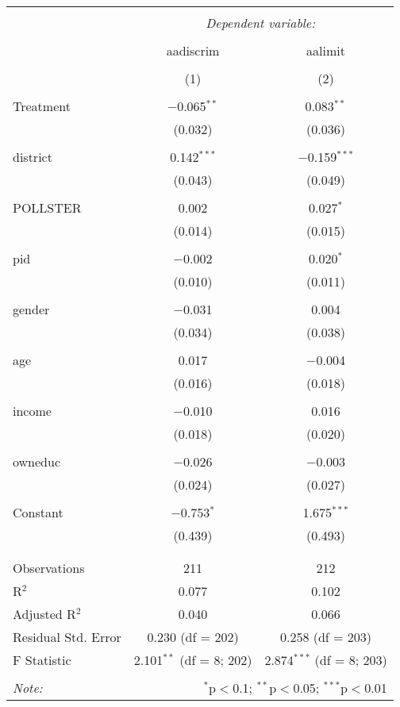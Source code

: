 
\begin{table}[!htbp] \centering 
  \caption{} 
  \label{} 
\begin{tabular}{@{\extracolsep{5pt}}lcc} 
\\[-1.8ex]\hline 
\hline \\[-1.8ex] 
 & \multicolumn{2}{c}{\textit{Dependent variable:}} \\ 
\cline{2-3} 
\\[-1.8ex] & aadiscrim & aalimit \\ 
\\[-1.8ex] & (1) & (2)\\ 
\hline \\[-1.8ex] 
 Treatment & $-$0.065$^{**}$ & 0.083$^{**}$ \\ 
  & (0.032) & (0.036) \\ 
  & & \\ 
 district & 0.142$^{***}$ & $-$0.159$^{***}$ \\ 
  & (0.043) & (0.049) \\ 
  & & \\ 
 POLLSTER & 0.002 & 0.027$^{*}$ \\ 
  & (0.014) & (0.015) \\ 
  & & \\ 
 pid & $-$0.002 & 0.020$^{*}$ \\ 
  & (0.010) & (0.011) \\ 
  & & \\ 
 gender & $-$0.031 & 0.004 \\ 
  & (0.034) & (0.038) \\ 
  & & \\ 
 age & 0.017 & $-$0.004 \\ 
  & (0.016) & (0.018) \\ 
  & & \\ 
 income & $-$0.010 & 0.016 \\ 
  & (0.018) & (0.020) \\ 
  & & \\ 
 owneduc & $-$0.026 & $-$0.003 \\ 
  & (0.024) & (0.027) \\ 
  & & \\ 
 Constant & $-$0.753$^{*}$ & 1.675$^{***}$ \\ 
  & (0.439) & (0.493) \\ 
  & & \\ 
\hline \\[-1.8ex] 
Observations & 211 & 212 \\ 
R$^{2}$ & 0.077 & 0.102 \\ 
Adjusted R$^{2}$ & 0.040 & 0.066 \\ 
Residual Std. Error & 0.230 (df = 202) & 0.258 (df = 203) \\ 
F Statistic & 2.101$^{**}$ (df = 8; 202) & 2.874$^{***}$ (df = 8; 203) \\ 
\hline 
\hline \\[-1.8ex] 
\textit{Note:}  & \multicolumn{2}{r}{$^{*}$p$<$0.1; $^{**}$p$<$0.05; $^{***}$p$<$0.01} \\ 
\end{tabular} 
\end{table} 
